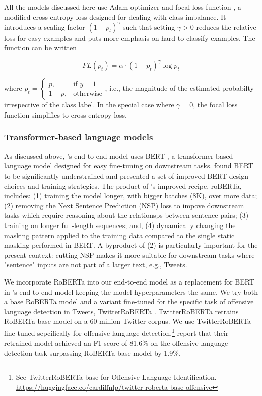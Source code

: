 \documentclass[letterpaper]{article} %
\begin{document}
All the models discussed here use Adam optimizer \citep{Kingma2014} and focal loss function \citep{lin2017focal}, a modified cross entropy loss designed for dealing with class imbalance. It introduces a scaling factor $(1-p_t)^\gamma$ such that setting $\gamma > 0$ reduces the relative loss for easy examples and puts more emphasis on hard to classify examples. The function can be written

$$
FL(p_t) = \alpha \cdot (1 - p_t)^\gamma \log{p_t}
$$

where $p_t = \begin{cases} p, & \text{if } y =1 \\ 1-p, & \text{otherwise}  \end{cases}$, i.e., the magnitude of the estimated probabilty irrespective of the class label. In the special case where $\gamma=0$, the focal loss function simplifies to cross entropy loss.

\subsubsection{Transformer-based language models}

As discussed above, \citet{Miao2022}'s end-to-end model uses BERT \citep{Devlin2018}, a transformer-based language model designed for easy fine-tuning on downstream tasks\citep{Devlin2018}. \citet{Liu2019} found BERT to be significantly understrained and presented a set of improved BERT design choices and training strategies. The product of \citet{Liu2019}'s improved recipe, roBERTa, includes: (1) training the model longer, with bigger batches (8K), over more data; (2) removing the Next Sentence Prediction (NSP) loss to impove downstream tasks which require reasoning about the relationsps between sentence pairs; (3) training on longer full-length sequences; and, (4) dynamically changing the masking pattern applied to the training data compared to the single static masking performed in BERT. A byproduct of (2) is particularly important for the present context: cutting NSP makes it more suitable for downstream tasks where "sentence" inputs are not part of a larger text, e.g., Tweets.

We incorporate RoBERTa into our end-to-end model as a replacement for BERT in \citet{Miao2022}'s end-to-end model keeping the model hyperparameters the same. We try both a base RoBERTa model and a variant fine-tuned for the specific task of offensive language detection in Tweets, TwitterRoBERTa \citep{Barbieri2020}. TwitterRoBERTa retrains RoBERTa-base model on a 60 million Twitter corpus. We use TwitterRoBERTa fine-tuned sepcifically for offensive language detection.\footnote{See TwitterRoBERTa-base for Offensive Language Identification. \url{https://huggingface.co/cardiffnlp/twitter-roberta-base-offensive}} \citet{Barbieri2020} report that their retrained model achieved an F1 score of 81.6\% on the offensive language detection task surpassing RoBERTa-base model by 1.9\%.
\end{document}
